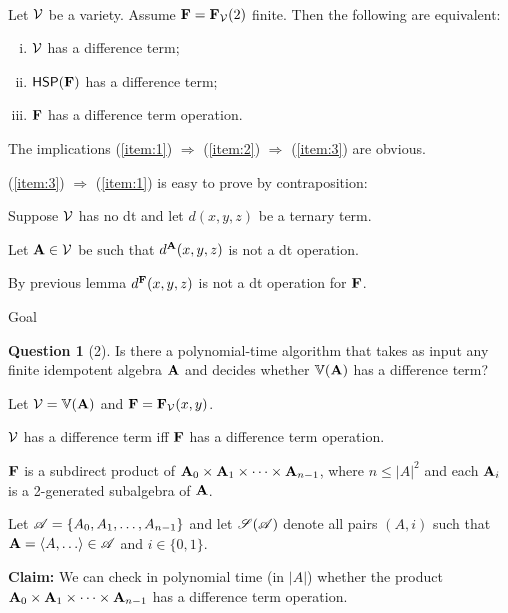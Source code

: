 \documentclass[notes=hide,12pt,xcolor=dvipsnames%
   ]{beamer}
\theoremstyle{definition}
\newtheorem{question}{Question}
\begin{document}
\begin{frame}[label=f2lem,shrink]{~}
  
\begin{corollary}
  \label{thm:F}
  Let $\mathcal{V}$ be a variety. Assume $\mathbf{F} = \mathbf{F}_{\mathcal{V}}(2)$ finite.
  Then the following are equivalent:
  \begin{enumerate}[(i)]
  \item \label{item:1}
    $\mathcal{V}$ has a difference term;
  \item \label{item:2}
    $\mathsf{H} \mathsf{S} \mathsf{P} (\mathbf{F})$ has a difference term;
  \item \label{item:3}
    $\mathbf{F}$ has a difference term operation.
  \end{enumerate}
\end{corollary}

\pause
The implications
  (\ref{item:1}) $\Rightarrow$  (\ref{item:2}) $\Rightarrow$  (\ref{item:3}) are
  obvious. 

  \pause 
  (\ref{item:3}) $\Rightarrow$  (\ref{item:1}) is easy to prove by contraposition:

  Suppose $\mathcal{V}$ has no dt and let $d(x,y,z)$ be a ternary term.

  Let $\mathbf{A}\in \mathcal{V}$ be such that $d^{\mathbf{A}}(x,y,z)$ is not a dt operation. 

  By previous lemma %
  $d^{\mathbf{F}}(x,y,z)$ is not a dt operation for $\mathbf{F}$.
\end{frame}

\begin{frame}[label=goal,shrink]{Goal}
  
  \begin{question}[2]
  Is there a polynomial-time algorithm that takes as input
  any finite idempotent algebra $\mathbf{A}$ and decides whether
  $\operatorname{\mathbb{V}}(\mathbf{A})$ has a difference term?
  \end{question}

  Let $\mathcal{V} = \operatorname{\mathbb{V}}(\mathbf{A})$ and $\mathbf{F} = \mathbf{F}_{\mathcal{V}}(x,y)$.

  $\mathcal{V}$ has a difference term iff
  $\mathbf{F}$ has a difference term operation.
  
  $\mathbf{F}$ is a subdirect product of
  $\mathbf{A}_0 \times \mathbf{A}_1 \times \cdots \times \mathbf{A}_{n-1}$, where $n\leq |A|^2$ and
  each $\mathbf{A}_i$ is a 2-generated subalgebra of $\mathbf{A}$.

  Let $\mathscr{A} = \{A_0, A_1, \dots, A_{n-1}\}$ and let $\mathscr{S}(\mathscr{A})$ denote 
  all pairs $(A, i)$ such that $\bA = \<A, \dots\> \in \scA$ and $i\in \{0,1\}$.

  {\bf Claim:} We can check in polynomial time (in $|A|$)
  whether the product
  $\mathbf{A}_0 \times \mathbf{A}_1 \times \cdots \times \mathbf{A}_{n-1}$ has a difference term operation.

\end{frame}
\end{document}
